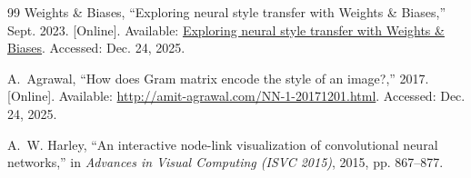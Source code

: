 \begin{thebibliography}{99}
Weights \& Biases, ``Exploring neural style transfer with Weights \& Biases,'' Sept. 2023. [Online]. Available: \href{https://wandb.ai/wandb_fc/articles/reports/Exploring-Neural-Style-Transfer-with-Weights-Biases--Vmlldzo1NDM1MjA2}{Exploring neural style transfer with Weights \& Biases}. Accessed: Dec. 24, 2025.

A.~Agrawal, ``How does Gram matrix encode the style of an image?,'' 2017. [Online]. Available: \url{http://amit-agrawal.com/NN-1-20171201.html}. Accessed: Dec. 24, 2025.

A.~W. Harley, ``An interactive node-link visualization of convolutional neural networks,'' in \emph{Advances in Visual Computing (ISVC 2015)}, 2015, pp. 867--877.

\end{thebibliography}

